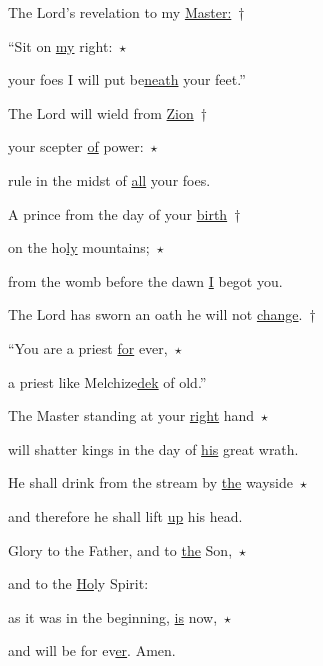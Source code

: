 
\noindent The Lord’s revelation to my \uline{Master:}~†~\nopagebreak

“Sit on \uline{my} right:~$\star$~\nopagebreak

your foes I will put be\uline{neath} your feet.”

\noindent The Lord will wield from \uline{Zion}~†~\nopagebreak

your scepter \uline{of} power:~$\star$~\nopagebreak

rule in the midst of \uline{all} your foes.

\noindent A prince from the day of your \uline{birth}~†~\nopagebreak

on the ho\uline{ly} mountains;~$\star$~\nopagebreak

from the womb before the dawn \uline{I} begot you.

\noindent The Lord has sworn an oath he will not \uline{change}.~†~\nopagebreak

“You are a priest \uline{for} ever,~$\star$~\nopagebreak

a priest like Melchize\uline{dek} of old.”

\noindent The Master standing at your \uline{right} hand~$\star$~\nopagebreak

will shatter kings in the day of \uline{his} great wrath.

\noindent He shall drink from the stream by \uline{the} wayside~$\star$~\nopagebreak

and therefore he shall lift \uline{up} his head.

\noindent Glory to the Father, and to \uline{the} Son,~$\star$~\nopagebreak

and to the \uline{Ho}ly Spirit:

\noindent as it was in the beginning, \uline{is} now,~$\star$~\nopagebreak

and will be for ev\uline{er}. Amen.

